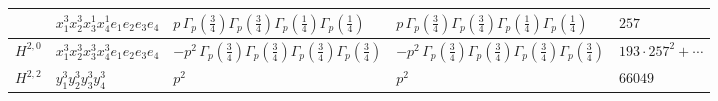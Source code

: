 \documentclass[11pt]{article}
\begin{document}
\begin{table}[ht]
{\begin{tabular}{@{}lllll@{}}
 & $x_{1}^{3} x_{2}^{3} x_{3}^{1} x_{4}^{1}  e_{1} e_{2} e_{3} e_{4}$ & $p \, \Gamma_p \left( \frac{3}{4} \right) \Gamma_p \left( \frac{3}{4} \right) \Gamma_p \left( \frac{1}{4} \right) \Gamma_p \left( \frac{1}{4} \right)$ & $p \, \Gamma_p \left( \frac{3}{4} \right) \Gamma_p \left( \frac{3}{4} \right) \Gamma_p \left( \frac{1}{4} \right) \Gamma_p \left( \frac{1}{4} \right)$ & $257$ \\
\midrule
$H^{2,0}$ & $x_{1}^{3} x_{2}^{3} x_{3}^{3} x_{4}^{3}  e_{1} e_{2} e_{3} e_{4}$ & $- p^{2} \, \Gamma_p \left( \frac{3}{4} \right) \Gamma_p \left( \frac{3}{4} \right) \Gamma_p \left( \frac{3}{4} \right) \Gamma_p \left( \frac{3}{4} \right)$ & $- p^{2} \, \Gamma_p \left( \frac{3}{4} \right) \Gamma_p \left( \frac{3}{4} \right) \Gamma_p \left( \frac{3}{4} \right) \Gamma_p \left( \frac{3}{4} \right)$ & $193{\cdot}257^{2}{+}\cdots$ \\
\midrule
$H^{2,2}$ & $y_{1}^{3} y_{2}^{3} y_{3}^{3} y_{4}^{3}$ & $p^{2} \,$ & $p^{2} \,$ & $66049$ \\
\bottomrule
\end{tabular}
}
\renewcommand{\arraystretch}{1.0}
\end{table}

\newpage
\end{document}
